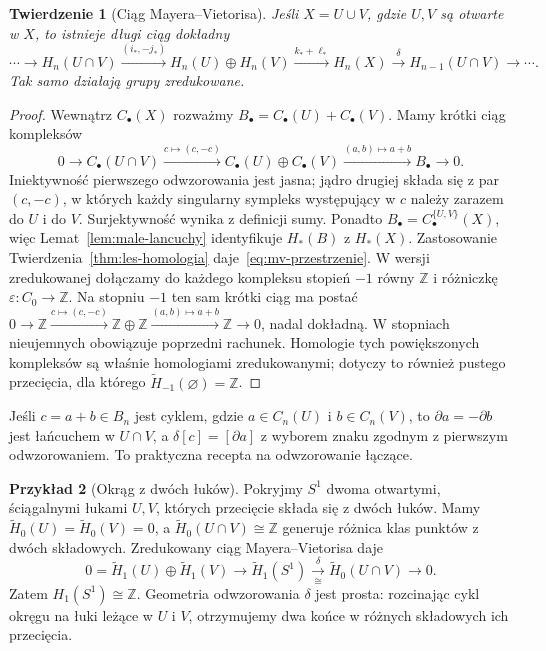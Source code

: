 \documentclass[11pt,a4paper,oneside]{report}
\newcommand{\Z}{\mathbb{Z}}
\theoremstyle{plain}
\newtheorem{twierdzenie}{Twierdzenie}[section]
\theoremstyle{definition}
\newtheorem{przyklad}[twierdzenie]{Przykład}
\theoremstyle{remark}
\begin{document}
\begin{twierdzenie}[Ciąg Mayera--Vietorisa]
\label{thm:mv-przestrzenie}
Jeśli $X=U\cup V$, gdzie $U,V$
są otwarte w $X$, to istnieje
długi ciąg dokładny
\begin{equation}\label{eq:mv-przestrzenie}
 \cdots\to H_n(U\cap V)
 \xrightarrow{(i_*,-j_*)}
 H_n(U)\oplus H_n(V)
 \xrightarrow{k_*+\ell_*}H_n(X)
 \xrightarrow{\delta}H_{n-1}(U\cap V)\to\cdots.
\end{equation}
Tak samo działają grupy zredukowane.
\end{twierdzenie}
\begin{proof}
Wewnątrz $C_\bullet(X)$ rozważmy
$B_\bullet=C_\bullet(U)+C_\bullet(V)$.
Mamy krótki ciąg kompleksów
\[
 0\to C_\bullet(U\cap V)
 \xrightarrow{c\mapsto(c,-c)}
 C_\bullet(U)\oplus C_\bullet(V)
 \xrightarrow{(a,b)\mapsto a+b}
 B_\bullet\to0.
\]
Iniektywność pierwszego odwzorowania jest jasna;
jądro drugiej składa się z par
$(c,-c)$, w których każdy singularny
sympleks występujący w $c$ należy
zarazem do $U$ i do $V$.
Surjektywność wynika z definicji sumy.
Ponadto $B_\bullet=C_\bullet^{\{U,V\}}(X)$,
więc Lemat~\ref{lem:male-lancuchy}
identyfikuje $H_*(B)$ z $H_*(X)$.
Zastosowanie Twierdzenia~\ref{thm:les-homologia}
daje~\eqref{eq:mv-przestrzenie}.
W wersji zredukowanej dołączamy
do każdego kompleksu stopień $-1$
równy $\Z$ i różniczkę
$\varepsilon:C_0\to\Z$.
Na stopniu $-1$ ten sam krótki
ciąg ma postać
$0\to\Z\xrightarrow{c\mapsto(c,-c)}
\Z\oplus\Z\xrightarrow{(a,b)\mapsto a+b}
\Z\to0$, nadal dokładną.
W stopniach nieujemnych
obowiązuje poprzedni rachunek.
Homologie tych powiększonych
kompleksów są właśnie
homologiami zredukowanymi;
dotyczy to również pustego
przecięcia, dla którego
$\widetilde H_{-1}(\varnothing)=\Z$.
\end{proof}

Jeśli $c=a+b\in B_n$ jest cyklem,
gdzie $a\in C_n(U)$ i $b\in C_n(V)$,
to $\partial a=-\partial b$ jest
łańcuchem w $U\cap V$, a
$\delta[c]=[\partial a]$ z wyborem
znaku zgodnym z pierwszym odwzorowaniem.
To praktyczna recepta na odwzorowanie łączące.

\begin{przyklad}[Okrąg z dwóch łuków]
\label{prz:mv-okrag}
Pokryjmy $S^1$ dwoma otwartymi,
ściągalnymi łukami $U,V$, których
przecięcie składa się z dwóch
łuków. Mamy
$\widetilde H_0(U)=
\widetilde H_0(V)=0$,
a $\widetilde H_0(U\cap V)\cong\Z$
generuje różnica klas punktów
z dwóch składowych.
Zredukowany ciąg
Mayera--Vietorisa daje
\[
 0=\widetilde H_1(U)\oplus
 \widetilde H_1(V)\to
 \widetilde H_1(S^1)
 \xrightarrow[\cong]{\delta}
 \widetilde H_0(U\cap V)\to0.
\]
Zatem $H_1(S^1)\cong\Z$.
Geometria odwzorowania $\delta$ jest prosta:
rozcinając cykl okręgu na łuki
leżące w $U$ i $V$, otrzymujemy
dwa końce w różnych składowych
ich przecięcia.
\end{przyklad}
\end{document}
